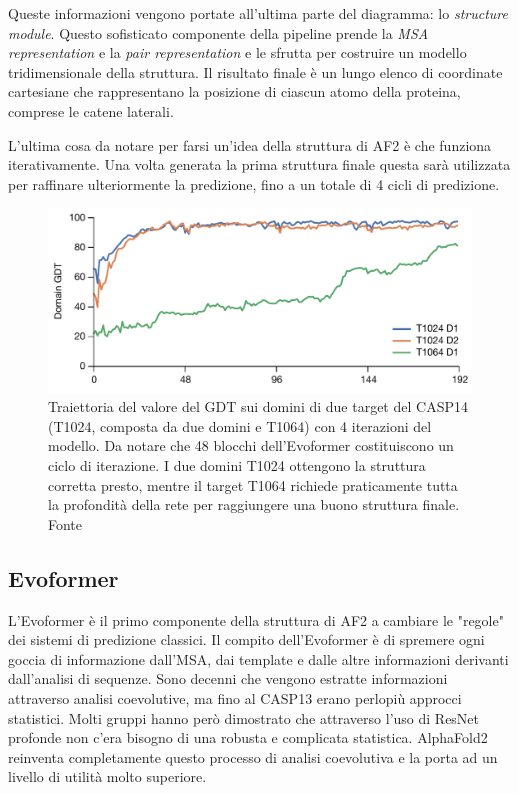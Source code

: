 \par Queste informazioni vengono portate all'ultima parte del diagramma: lo \textit{structure module}. Questo sofisticato componente della pipeline prende la \textit{MSA representation} e la \textit{pair representation} e le sfrutta per costruire un modello tridimensionale della struttura. Il risultato finale è un lungo elenco di coordinate cartesiane che rappresentano la posizione di ciascun atomo della proteina, comprese le catene laterali.

\par L'ultima cosa da notare per farsi un'idea della struttura di AF2 è che funziona iterativamente. Una volta generata la prima struttura finale questa sarà utilizzata per raffinare ulteriormente la predizione, fino a un totale di 4 cicli di predizione.

\begin{figure}[!htb]
	\centering
	\includegraphics[scale=0.4]{images/af2-iterazioni.png}
	\caption{Traiettoria del valore del GDT sui domini di due target del CASP14 (T1024, composta da due domini e T1064) con 4 iterazioni del modello. Da notare che 48 blocchi dell'Evoformer costituiscono un ciclo di iterazione. I due domini T1024 ottengono la struttura corretta presto, mentre il target T1064 richiede praticamente tutta la profondità della rete per raggiungere una buono struttura finale. Fonte\cite{jumper2021highly}}
	\label{fig:af2-iterazioni}
\end{figure}

\subsection{Evoformer}
L'Evoformer è il primo componente della struttura di AF2 a cambiare le "regole" dei sistemi di predizione classici. Il compito dell'Evoformer è di spremere ogni goccia di informazione dall'MSA, dai template e dalle altre informazioni derivanti dall'analisi di sequenze. Sono decenni che vengono estratte informazioni attraverso analisi coevolutive, ma fino al CASP13 erano perlopiù approcci statistici. Molti gruppi hanno però dimostrato che attraverso l'uso di ResNet profonde non c'era bisogno di una robusta e complicata statistica. AlphaFold2 reinventa completamente questo processo di analisi coevolutiva e la porta ad un livello di utilità molto superiore.


